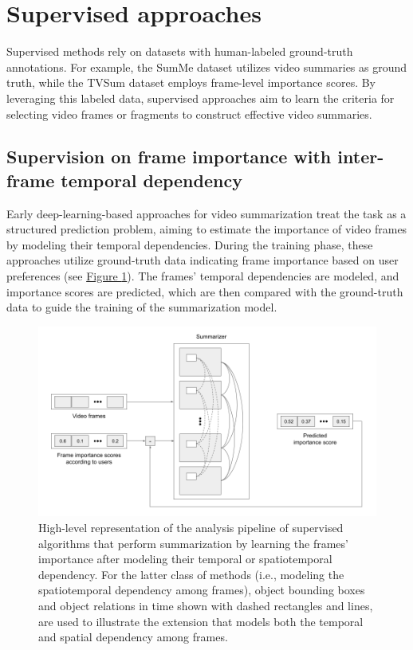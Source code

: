 \label{section:rel-supervised}
\section{Supervised approaches} 
Supervised methods rely on datasets with human-labeled ground-truth annotations. For example, the SumMe dataset \cite{SumMe} utilizes video summaries as ground truth, while the TVSum dataset \cite{TVSum} employs frame-level importance scores. By leveraging this labeled data, supervised approaches aim to learn the criteria for selecting video frames or fragments to construct effective video summaries.

\subsection{Supervision on frame importance with inter-frame temporal dependency}
\label{subsec:rel-sup-temporal-dependency}

Early deep-learning-based approaches for video summarization treat the task as a structured prediction problem, aiming to estimate the importance of video frames by modeling their temporal dependencies. During the training phase, these approaches utilize ground-truth data indicating frame importance based on user preferences (see \hyperref[figure:rel-sup-model]{Figure \ref{figure:rel-sup-model}}). The frames' temporal dependencies are modeled, and importance scores are predicted, which are then compared with the ground-truth data to guide the training of the summarization model.

\begin{figure}[ht]
  \centering
  \includegraphics[width=0.73\paperwidth]{content/related/figures/sup-model.png}
  \caption{ High-level representation of the analysis pipeline of supervised algorithms that perform summarization by learning the frames' importance after modeling their temporal or spatiotemporal dependency. For the latter class of methods (i.e., modeling the spatiotemporal dependency among frames), object bounding boxes and object relations in time shown with dashed rectangles and lines, are used to illustrate the extension that models both the temporal and spatial dependency among frames.}
  \label{figure:rel-sup-model}
\end{figure}

